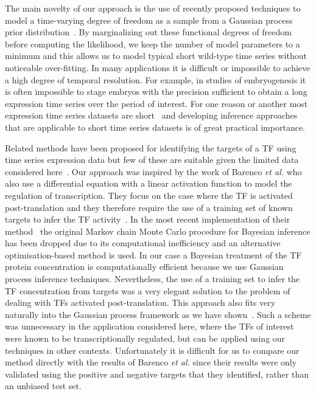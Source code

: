 \documentclass{pnastwo}
\begin{document}
\begin{article}
The main novelty of our approach is the use of recently proposed
techniques to model a time-varying degree of freedom as a sample from
a Gaussian process prior distribution~\cite{Gao2008}. By marginalizing
out these functional
degrees of freedom before computing the likelihood, we keep the
number of model parameters to a minimum and this allows us to model
typical short wild-type time series without noticeable over-fitting. In
many applications it is difficult or impossible to achieve a high
degree of temporal resolution. For example, in studies of
embryogenesis it is often impossible to stage embryos with the
precision sufficient to obtain a long expression time series over the
period of interest. For one reason or another most expression time
series datasets are short~\cite{Ernst2005} and developing inference approaches
that are applicable to short time series datasets is of great
practical importance.  

Related methods have been proposed for identifying the
targets of a TF using time series expression data but few of these are suitable given the
limited data considered here~\cite{Bansal2007a}. Our approach was inspired by the work of Barenco {\em et
al.} who also use a differential equation with a linear activation
function to model the regulation of transcription. They focus on the
case where the TF is activated post-translation and they therefore
require the use of a training set of
known targets to infer the TF activity~\cite{Barenco2006a}. In the most recent
implementation of their method~\cite{Barenco2009} the original Markov
chain Monte Carlo procedure for Bayesian inference has been dropped due to its computational
inefficiency and an alternative optimisation-based method is used. In our case a Bayesian treatment of the TF protein
concentration is computationally efficient because we use Gaussian
process inference techniques.
Nevertheless, the use of a training set to infer the
TF concentration from targets was a very elegant solution to the
problem of dealing with TFs activated post-translation. This
approach also fits very naturally into the Gaussian process
framework as we have shown~\cite{Gao2008}. Such a scheme was unnecessary in the application considered
here, where the TFs of interest were known to be transcriptionally
regulated, but can be applied using our techniques in other
contexts. Unfortunately it is difficult for us to compare our method
directly with the results of Barenco {\em et al.} since their results
were only validated using the positive and negative targets that they identified,
rather than an unbiased test set. 


\end{article}
\end{document}
